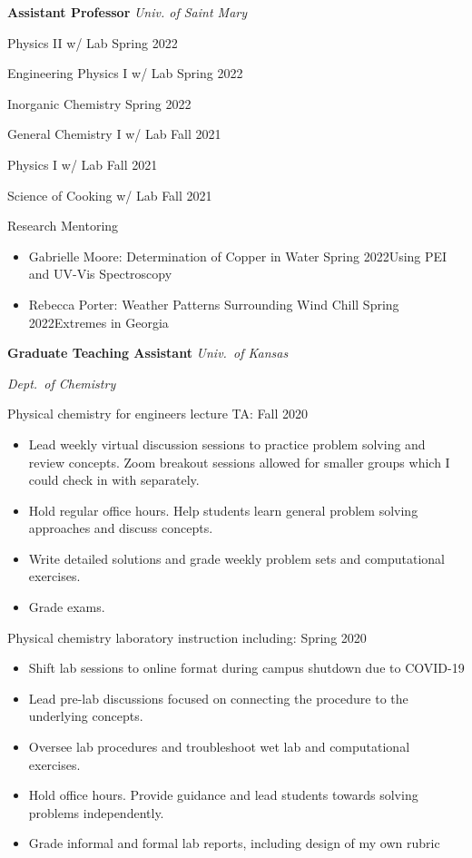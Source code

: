 {\bf Assistant Professor} \hfill \textit{Univ. of Saint Mary}

Physics II w/ Lab \hfill Spring 2022

Engineering Physics I w/ Lab \hfill Spring 2022

Inorganic Chemistry \hfill Spring 2022

General Chemistry I w/ Lab \hfill Fall 2021

Physics I w/ Lab \hfill Fall 2021

Science of Cooking w/ Lab \hfill Fall 2021

\vspace{6pt}
Research Mentoring
\begin{itemize}[rightmargin=0pt]
  \item Gabrielle Moore: Determination of Copper in Water \hfill Spring 2022\linebreak Using PEI and UV-Vis Spectroscopy
  \item Rebecca Porter: Weather Patterns Surrounding Wind Chill \hfill Spring 2022\linebreak Extremes in Georgia
\end{itemize}
\vspace{\y}

{\bf Graduate Teaching Assistant} \hfill \textit{Univ.\ of Kansas}

\hfill \textit{Dept.\ of Chemistry}

Physical chemistry for engineers lecture TA: \hfill Fall 2020
\begin{itemize}[rightmargin=\dimexpr\linewidth-10cm-\leftmargin\relax,noitemsep,topsep=0cm]
\raggedright
  \item Lead weekly virtual discussion sessions to practice problem solving and review concepts. Zoom breakout sessions allowed for smaller groups which I could check in with separately.
  \item Hold regular office hours. Help students learn general problem solving approaches and discuss concepts.
  \item Write detailed solutions and grade weekly problem sets and computational exercises.
  \item Grade exams.
\end{itemize}

\vspace{\y}
Physical chemistry laboratory instruction including: \hfill Spring 2020
\begin{itemize}[rightmargin=\dimexpr\linewidth-10cm-\leftmargin\relax,noitemsep,topsep=0cm]
\raggedright
  \item Shift lab sessions to online format during campus shutdown due to COVID-19
  \item Lead pre-lab discussions focused on connecting the procedure to the underlying concepts.
  \item Oversee lab procedures and troubleshoot wet lab and computational
  exercises.
  \item Hold office hours. Provide guidance and lead students towards solving problems independently.
  \item Grade informal and formal lab reports, including design of my own rubric
\end{itemize}

